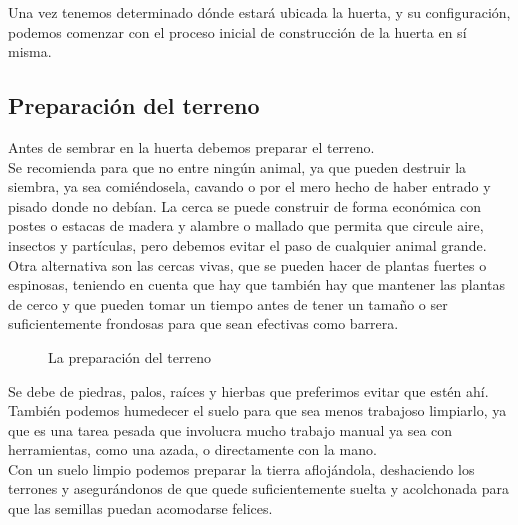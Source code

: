 \documentclass[../main.tex]{subfiles}
\begin{document}
Una vez tenemos determinado dónde estará ubicada la huerta, y su configuración, podemos comenzar con el proceso inicial de construcción de la huerta en sí misma.

\subsection{Preparación del terreno}

Antes de sembrar en la huerta debemos preparar el terreno.\\


Se recomienda  para que no entre ningún animal, ya que pueden destruir la siembra, ya sea comiéndosela, cavando o por el mero hecho de haber entrado y pisado donde no debían. 
La cerca se puede construir de forma económica con postes o estacas de madera y alambre o mallado que permita que circule aire, insectos y partículas, pero debemos evitar el paso de cualquier animal grande. Otra alternativa son las cercas vivas, que se pueden hacer de plantas fuertes o espinosas, teniendo en cuenta que hay que también hay que mantener las plantas de cerco y que pueden tomar un tiempo antes de tener un tamaño o ser suficientemente frondosas para que sean efectivas como barrera. \\

\begin{wrapfigure}[20]{o}[0cm]{0.45\textwidth}
    \centering
    \caption*{\color{CompostGreen!50!black}La preparación del terreno}
    \label{prep1}
\end{wrapfigure}

Se debe  de piedras, palos, raíces y hierbas que preferimos evitar que estén ahí. También podemos humedecer el suelo para que sea menos trabajoso limpiarlo, ya que es una tarea pesada que involucra mucho trabajo manual ya sea con herramientas, como una azada, o directamente con la mano. \\
Con un suelo limpio podemos preparar la tierra aflojándola, deshaciendo los terrones y asegurándonos de que quede suficientemente suelta y acolchonada para que las semillas puedan acomodarse felices. \\
\end{document}
